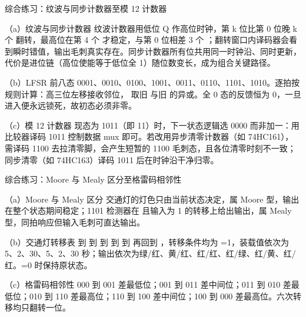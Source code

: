 \begin{chapteranswer}{综合练习：纹波与同步计数器至模 12 计数器}
\begin{answersubproblem}{（a）纹波与同步计数器}
纹波计数器用低位 Q 作高位时钟，第 k 位比第 0 位晚 k 个  翻转，最高位在第 4 个  才稳定，与第 0 位相差 3 个 ；翻转窗口内译码器会看到瞬时错值，输出毛刺真实存在。同步计数器所有位共用同一时钟沿、同时更新，代价是进位链（高位使能等于低位全 1）随位数变长，成为组合关键路径。
\end{answersubproblem}
\begin{answersubproblem}{（b）LFSR 前八态}
0001、0010、0100、1001、0011、0110、1101、1010。逐拍按规则计算：高三位左移接收邻位， 取旧  与旧  的异或。全 0 态的反馈恒为 0，一旦进入便永远锁死，故初态必须非零。
\end{answersubproblem}
\begin{answersubproblem}{（c）模 12 计数器}
现态为 1011（即 11）时，下一状态逻辑选 0000 而非加一：用比较器译码 1011 控制数据 mux 即可。若改用异步清零计数器（如 74HC161），需译码 1100 去拉清零脚，会产生短暂的 1100 毛刺态，且各位清零时刻不一致；同步清零（如 74HC163）译码 1011 后在时钟沿干净归零。
\end{answersubproblem}
\end{chapteranswer}

\begin{chapteranswer}{综合练习：Moore 与 Mealy 区分至格雷码相邻性}
\begin{answersubproblem}{（a）Moore 与 Mealy 区分}
交通灯的灯色只由当前状态决定，属 Moore 型，输出在整个状态期间稳定；1101 检测器在  且输入为 1 的转移上给出输出，属 Mealy 型，同拍响应但输入毛刺可直达输出。
\end{answersubproblem}
\begin{answersubproblem}{（b）交通灯转移表}
 到  到  到  到  到  再回到 ，转移条件均为 =1，装载值依次为 5、2、30、5、2、30 秒；输出依次为绿/红、黄/红、红/红、红/绿、红/黄、红/红。=0 时保持原状态。
\end{answersubproblem}
\begin{answersubproblem}{（c）格雷码相邻性}
000 到 001 差最低位；001 到 011 差中间位；011 到 010 差最低位；010 到 110 差最高位；110 到 100 差中间位；100 到 000 差最高位。六次转移均只翻转一位。
\end{answersubproblem}
\end{chapteranswer}
